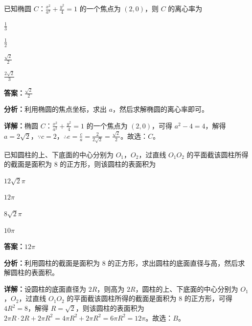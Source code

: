 \begin{question}[points=5]
已知椭圆 $C$：$\frac{x^2}{a^2}+\frac{y^2}{4}=1$ 的一个焦点为 $(2,0)$，则 $C$ 的离心率为
\begin{choices}
  \item $\frac{1}{3}$
  \item $\frac{1}{2}$
  \item $\frac{\sqrt{2}}{2}$
  \item $\frac{2\sqrt{2}}{3}$
\end{choices}
\begin{solution}
\textbf{答案：}$\frac{\sqrt{2}}{2}$

\textbf{分析：}利用椭圆的焦点坐标，求出 $a$，然后求解椭圆的离心率即可。

\textbf{详解：}椭圆 $C$：$\frac{x^2}{a^2}+\frac{y^2}{4}=1$ 的一个焦点为 $(2,0)$，可得 $a^2-4=4$，解得 $a=2\sqrt{2}$，$\because c=2$，$\therefore e=\frac{c}{a}=\frac{2}{2\sqrt{2}}=\frac{\sqrt{2}}{2}$。故选：$C$。
\end{solution}
\end{question}

\begin{question}[points=5]
已知圆柱的上、下底面的中心分别为 $O_1$，$O_2$，过直线 $O_1O_2$ 的平面截该圆柱所得的截面是面积为 $8$ 的正方形，则该圆柱的表面积为
\begin{choices}
  \item $12\sqrt{2}\pi$
  \item $12\pi$
  \item $8\sqrt{2}\pi$
  \item $10\pi$
\end{choices}
\begin{solution}
\textbf{答案：}$12\pi$

\textbf{分析：}利用圆柱的截面是面积为 $8$ 的正方形，求出圆柱的底面直径与高，然后求解圆柱的表面积。

\textbf{详解：}设圆柱的底面直径为 $2R$，则高为 $2R$，圆柱的上、下底面的中心分别为 $O_1$，$O_2$，过直线 $O_1O_2$ 的平面截该圆柱所得的截面是面积为 $8$ 的正方形，可得 $4R^2=8$，解得 $R=\sqrt{2}$，则该圆柱的表面积为 $2\pi R\cdot 2R+2\pi R^2=4\pi R^2+2\pi R^2=6\pi R^2=12\pi$。故选：$B$。
\end{solution}
\end{question}

